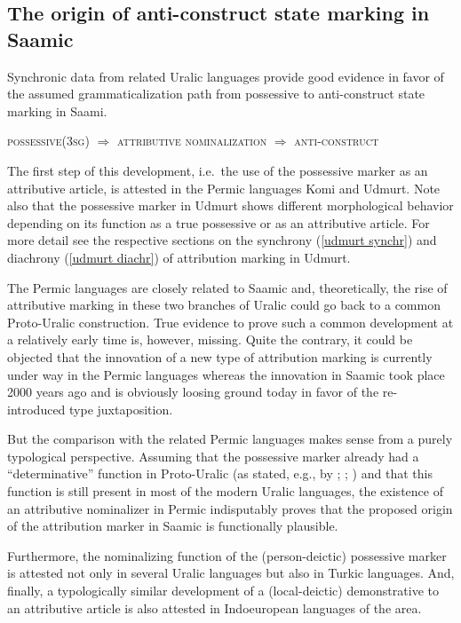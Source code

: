 {\subsection{The origin of anti-construct state marking in Saamic}
Synchronic data from related Uralic languages provide good evidence in favor of the assumed grammaticalization path from possessive to anti-construct state marking in Saami. 
\begin{exe}
\ex \textsc{possessive(3sg)} $\Rightarrow$ \textsc{attributive nominalization} $\Rightarrow$ \textsc{anti}-\textsc{construct}
\end{exe}
The first step of this development, i.e.~the use of the possessive marker as an attributive article, is attested in the Permic languages Komi and Udmurt. Note also that the possessive marker in Udmurt shows different morphological behavior depending on its function as a true possessive or as an attributive article. For more detail see the respective sections on the synchrony (\ref{udmurt synchr}) and diachrony (\ref{udmurt diachr}) of attribution marking in Udmurt.

The Permic languages are closely related to Saamic and, theoretically, the rise of attributive marking in these two branches of Uralic could go back to a common Proto-Uralic construction. True evidence to prove such a common development at a relatively early time is, however, missing. Quite the contrary, it could be objected that the innovation of a new type of attribution marking is currently under way in the Permic languages whereas the innovation in Saamic took place 2000 years ago and is obviously loosing ground today in favor of the re-introduced type juxtaposition.

But the comparison with the related Permic languages makes sense from a purely typological perspective. Assuming that the possessive marker already had a “determinative” function in Proto-Uralic (as stated, e.g., by \citealt[32]{janhunen1981}; \citealt[66, 81]{decsy1990}; \citealt{kunnap2004}) and that this function is still present in most of the modern Uralic languages, the existence of an attributive nominalizer in Permic indisputably proves that the proposed origin of the attribution marker in Saamic is functionally plausible.

Furthermore, the nominalizing function of the (person-deictic) possessive marker is attested not only in several Uralic languages but also in Turkic languages. And, finally, a typologically similar development of a (local-deictic) demonstrative to an attributive article is also attested in Indoeuropean languages of the area.

}
